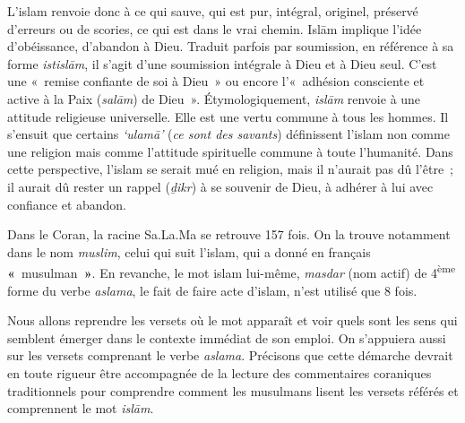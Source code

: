 L'islam renvoie donc à ce qui sauve, qui est pur, intégral, originel,
préservé d'erreurs ou de scories, ce qui est dans le vrai chemin. Islām
implique l'idée d'obéissance, d'abandon à Dieu. Traduit parfois par
soumission, en référence à sa forme \emph{istislām}, il s'agit d'une
soumission intégrale à Dieu et à Dieu seul. C'est une «~remise confiante
de soi à Dieu~» ou
encore l'«~adhésion consciente et active à la Paix (\emph{salām}) de
Dieu~». Étymologiquement, \emph{islām} renvoie à une attitude religieuse
universelle. Elle est une vertu commune à tous les hommes. Il s'ensuit
que certains \emph{`ulamā'} (\emph{ce sont des savants}) définissent
l'islam non comme une religion mais comme l'attitude spirituelle commune
à toute l'humanité. Dans cette perspective, l'islam se serait mué en
religion, mais il n'aurait pas dû l'être~; il aurait dû rester un rappel
(\emph{ḏikr}) à se souvenir de Dieu, à adhérer à lui avec confiance et
abandon.


Dans le Coran, la racine Sa.La.Ma se retrouve 157 fois. On la trouve
notamment dans le nom \emph{muslim}, celui qui suit l'islam, qui a donné
en français \textbf{«}~musulman~\textbf{»}. En revanche, le mot islam
 lui-même, \emph{masdar} (nom actif) de
4\textsuperscript{ème} forme du verbe \emph{aslama}, le fait de faire
acte d'islam, n'est utilisé que 8 fois.

Nous allons reprendre les versets où le mot apparaît et voir quels sont
les sens qui semblent émerger dans le contexte immédiat de son emploi.
On s'appuiera aussi sur les versets comprenant le verbe \emph{aslama}.
Précisons que cette démarche devrait en toute rigueur être accompagnée
de la lecture des commentaires coraniques traditionnels pour comprendre
comment les musulmans lisent les versets référés et comprennent le mot
\emph{islām}.

